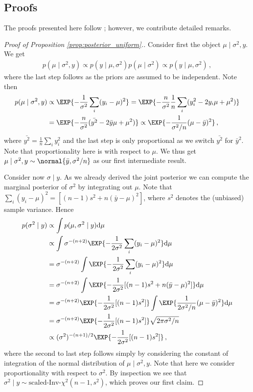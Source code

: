\subsection{Proofs}
\begin{remark}
The proofs presented here follow \citet{gelmanbda04}; however, we contribute detailed remarks.
\end{remark}

\begin{proof}[Proof of Proposition \ref{prop:posterior_uniform}.]
  Consider first the object $\mu \mid \sigma^2, y$.
  We get
  \begin{align*}
    p(\mu \mid \sigma^2, y) \propto p(y \mid \mu, \sigma^2) p(\mu \mid \sigma^2) \propto p(y \mid \mu, \sigma^2) \,,
  \end{align*}
  where the last step follows as the priors are assumed to be independent.
  Note then
  \begin{align*}
    p(\mu \mid \sigma^2, y) &\propto \EXP{-\frac{1}{\sigma^2}\sum_i (y_i - \mu)^2} = \EXP{-\frac{n}{\sigma^2} \frac{1}{n}\sum_i (y_i^2 - 2y_i \mu + \mu^2)}\\
    &=\EXP{-\frac{n}{\sigma^2} (\bar{y^2} - 2 \bar{y} \mu + \mu^2)} \propto
    \EXP{-\frac{1}{\sigma^2 / n} (\mu - \bar{y})^2} \,,
  \end{align*}
  where $\bar{y^2} = \frac{1}{n}\sum_i y_i^2$ and the last step is only proportional as we switch $\bar{y^2}$ for $\bar{y}^2$.
  Note that proportionality here is with respect to $\mu$.
  We thus get $\mu \mid \sigma^2, y \sim \normal{\bar{y}, \sigma^2/n}$ as our first intermediate result.

  Consider now $\sigma \mid y$.
  As we already derived the joint posterior we can compute the marginal posterior of $\sigma^2$ by integrating out $\mu$.
  Note that $\sum_i (y_i - \mu)^2 = [(n-1)s^2 + n(\bar{y} - \mu)^2]$, where $s^2$ denotes the (unbiased) sample variance. Hence
  \begin{align*}
    p(\sigma^2 \mid y) &\propto \int p(\mu, \sigma^2 \mid y) \mathrm{d} \mu\\
    &\propto \int \sigma^{-(n+2)} \EXP{-\frac{1}{2\sigma^2}\sum_i (y_i - \mu)^2} \mathrm{d} \mu\\
    &= \sigma^{-(n+2)} \int \EXP{-\frac{1}{2\sigma^2}\sum_i (y_i - \mu)^2} \mathrm{d} \mu\\
    &= \sigma^{-(n+2)} \int \EXP{-\frac{1}{2\sigma^2}[(n-1) s^2 + n(\bar{y} - \mu)^2]} \mathrm{d} \mu\\
    &= \sigma^{-(n+2)} \EXP{-\frac{1}{2\sigma^2}[(n-1) s^2]} \int \EXP{\frac{1}{2\sigma^2/n}(\mu - \bar{y})^2} \mathrm{d} \mu\\
    &= \sigma^{-(n+2)} \EXP{-\frac{1}{2\sigma^2}[(n-1) s^2]} \sqrt{2 \pi \sigma^2 / n} \\
    &\propto (\sigma^2)^{-(n+1)/2} \EXP{-\frac{1}{2\sigma^2}[(n-1) s^2]} \,,
  \end{align*}
  where the second to last step follows simply by considering the constant of integration of the normal distribution of $\mu \mid \sigma^2, y$.
  Note that here we consider proportionality with respect to $\sigma^2$.
  By inspection we see that $\sigma^2 \mid y \sim \text{scaled-Inv-} \chi^2(n-1, s^2)$, which proves our first claim.


\end{proof}

